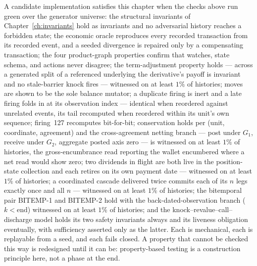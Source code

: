 A candidate implementation satisfies this chapter when the checks above run green over the
generator universe: the structural invariants of Chapter~\ref{ch:invariants} hold as
invariants and no adversarial history reaches a forbidden state; the economic oracle
reproduces every recorded transaction from its recorded event, and a seeded divergence is
repaired only by a compensating transaction; the four product-graph properties confirm that
watches, state schema, and actions never disagree; the term-adjustment property holds ---
across a generated split of a referenced underlying the derivative's payoff is invariant and
no stale-barrier knock fires --- witnessed on at least $1\%$ of histories; moves are shown to
be the sole balance mutator; a duplicate firing is inert and a late firing folds in at its observation index ---
identical when reordered against unrelated events, its tail recomputed when reordered within
its unit's own sequence; firing~127 recomputes bit-for-bit; conservation holds per (unit,
coordinate, agreement) and the cross-agreement netting branch --- post under $G_1$, receive
under $G_2$, aggregate posted axis zero --- is witnessed on at least $1\%$ of histories, the
gross-encumbrance read reporting the wallet encumbered where a net read would show zero; two
dividends in flight are both live in the position-state collection and each retires on its own
payment date --- witnessed on at least $1\%$ of histories; a coordinated cascade delivered
twice commits each of its $n$ legs exactly once and all $n$ --- witnessed on at least $1\%$ of
histories; the
bitemporal pair BITEMP-1 and BITEMP-2 hold with the back-dated-observation branch
($k<\text{end}$) witnessed on at least $1\%$ of histories; and the
knock--revalue--call--discharge model holds its two safety
invariants
always and its liveness obligation eventually, with sufficiency asserted only as the latter.
Each is mechanical, each is replayable from a seed, and each fails closed. A property that
cannot be checked this way is redesigned until it can be: property-based testing is a
construction principle here, not a phase at the end.
